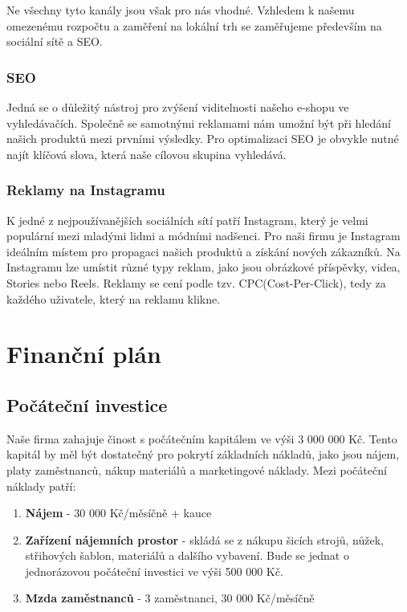 \documentclass[12pt, a4paper]{article}
\begin{document}
Ne všechny tyto kanály jsou však pro nás vhodné. Vzhledem k našemu omezenému rozpočtu a zaměření na lokální trh se zaměřujeme především na sociální sítě a SEO.

\subsubsection{SEO}

Jedná se o důležitý nástroj pro zvýšení viditelnosti našeho e-shopu ve vyhledávačích.
Společně se samotnými reklamami nám umožní být při hledání našich produktů mezi prvními výsledky.
Pro optimalizaci SEO je obvykle nutné najít klíčová slova, která naše cílovou skupina vyhledává.

\subsubsection{Reklamy na Instagramu}

K jedné z nejpoužívanějších sociálních sítí patří Instagram, který je velmi populární mezi mladými lidmi a módními nadšenci.
Pro naši firmu je Instagram ideálním místem pro propagaci našich produktů a získání nových zákazníků.
Na Instagramu lze umístit různé typy reklam, jako jsou obrázkové příspěvky, videa, Stories nebo Reels.
Reklamy se cení podle tzv. CPC(Cost-Per-Click), tedy za každého uživatele, který na reklamu klikne.

\section{Finanční plán}

\subsection{Počáteční investice}

Naše firma zahajuje činost s počátečním kapitálem ve výši 3 000 000 Kč.
Tento kapitál by měl být dostatečný pro pokrytí základních nákladů,
jako jsou nájem, platy zaměstnanců, nákup materiálů a marketingové náklady.
Mezi počáteční náklady patří:

\begin{enumerate}
  \item \textbf{Nájem} - 30 000 Kč/měsíčně + kauce
  \item \textbf{Zařízení nájemních prostor} - skládá se z nákupu šicích strojů, nůžek, střihových šablon, materiálů a dalšího vybavení.
  Bude se jednat o jednorázovou počáteční investici ve výši 500 000 Kč.
  \item \textbf{Mzda zaměstnanců} - 3 zaměstnanci, 30 000 Kč/měsíčně
\end{enumerate}
\end{document}
